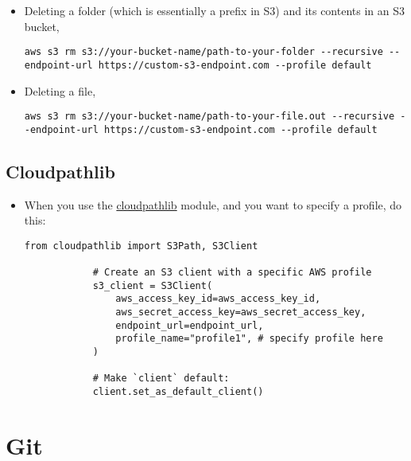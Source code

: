 \documentclass[12pt, a4paper]{article}
\numberwithin{equation}{section}
\theoremstyle{definition}
\theoremstyle{definition}
\begin{document}
	\begin{itemize}
		\item Deleting a folder (which is essentially a prefix in S3) and its contents in
		an S3 bucket, 
		
		\begin{lstlisting}[style=mystylebash, label=alg:aws__dir_rm, xleftmargin=\parindent]
			aws s3 rm s3://your-bucket-name/path-to-your-folder --recursive --endpoint-url https://custom-s3-endpoint.com --profile default
		\end{lstlisting}
		
		\item Deleting a file, 
		
		\begin{lstlisting}[style=mystylebash, label=alg:aws__file_rm, xleftmargin=\parindent]
			aws s3 rm s3://your-bucket-name/path-to-your-file.out --recursive --endpoint-url https://custom-s3-endpoint.com --profile default
		\end{lstlisting}
		
	\end{itemize}

	\subsection{Cloudpathlib}
	
	\begin{itemize}
		\item When you use the \href{https://cloudpathlib.drivendata.org/stable/}{cloudpathlib} module, and you want to specify a profile, do this:
		
		\begin{lstlisting}[style=mystylepython, label=alg:aws__cloudpathlib_profile, xleftmargin=\parindent]
			from cloudpathlib import S3Path, S3Client
			
			# Create an S3 client with a specific AWS profile
			s3_client = S3Client(
				aws_access_key_id=aws_access_key_id,
				aws_secret_access_key=aws_secret_access_key,
				endpoint_url=endpoint_url,
				profile_name="profile1", # specify profile here
			)
			
			# Make `client` default:
			client.set_as_default_client()
		\end{lstlisting}
		
	\end{itemize}

	\newpage 
	
	\section{Git}
	
\end{document}
